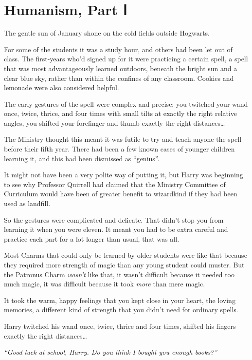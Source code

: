 \chapter{Humanism, Part Ⅰ}

The gentle sun of January shone on the cold fields outside Hogwarts.

For some of the students it was a study hour, and others had been let
out of class. The first-years who'd signed up for it were practicing a
certain spell, a spell that was most advantageously learned outdoors,
beneath the bright sun and a clear blue sky, rather than within the
confines of any classroom. Cookies and lemonade were also considered
helpful.

The early gestures of the spell were complex and precise; you twitched
your wand once, twice, thrice, and four times with small tilts at
exactly the right relative angles, you shifted your forefinger and thumb
exactly the right distances\ldots{}

The Ministry thought this meant it was futile to try and teach anyone
the spell before their fifth year. There had been a few known cases of
younger children learning it, and this had been dismissed as ``genius''.

It might not have been a very polite way of putting it, but Harry was
beginning to see why Professor Quirrell had claimed that the Ministry
Committee of Curriculum would have been of greater benefit to wizardkind
if they had been used as landfill.

So the gestures were complicated and delicate. That didn't stop you from
learning it when you were eleven. It meant you had to be extra careful
and practice each part for a lot longer than usual, that was all.

Most Charms that could only be learned by older students were like that
because they required more strength of magic than any young student
could muster. But the Patronus Charm \emph{wasn't} like that, it wasn't
difficult because it needed too much magic, it was difficult because it
took \emph{more} than mere magic.

It took the warm, happy feelings that you kept close in your heart, the
loving memories, a different kind of strength that you didn't need for
ordinary spells.

Harry twitched his wand once, twice, thrice and four times, shifted his
fingers exactly the right distances\ldots{}

\emph{``Good luck at school, Harry. Do you think I bought you enough
books?''}

